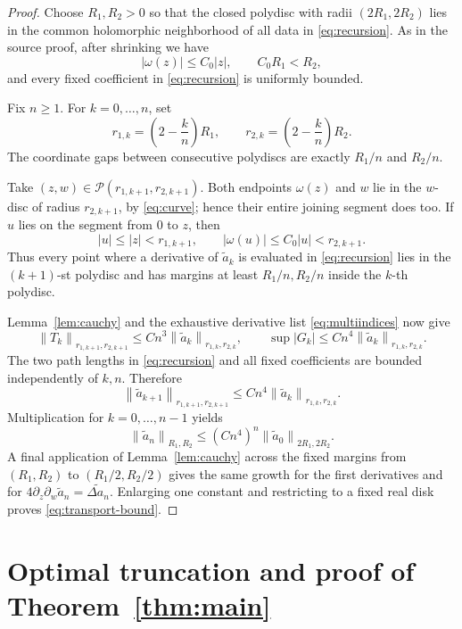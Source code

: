 \documentclass[11pt]{article}
\newcommand{\norm}[1]{\left\lVert#1\right\rVert}
\begin{document}
\begin{proof}
Choose $R_1,R_2>0$ so that the closed polydisc with radii
$(2R_1,2R_2)$ lies in the common holomorphic neighborhood of all data in
\eqref{eq:recursion}.  As in the source proof, after shrinking we have
\begin{equation}\label{eq:curve}
 |\omega(z)|\leq C_0|z|,
 \qquad C_0R_1<R_2,
\end{equation}
and every fixed coefficient in \eqref{eq:recursion} is uniformly bounded.

Fix $n\geq1$.  For $k=0,\ldots,n$, set
\[
 r_{1,k}=\left(2-\frac{k}{n}\right)R_1,
 \qquad
 r_{2,k}=\left(2-\frac{k}{n}\right)R_2.
\]
The coordinate gaps between consecutive polydiscs are exactly
$R_1/n$ and $R_2/n$.

Take $(z,w)\in\mathcal P(r_{1,k+1},r_{2,k+1})$.  Both endpoints
$\omega(z)$ and $w$ lie in the $w$-disc of radius $r_{2,k+1}$, by
\eqref{eq:curve}; hence their entire joining segment does too.  If $u$ lies
on the segment from $0$ to $z$, then
\[
 |u|\leq |z|<r_{1,k+1},
 \qquad |\omega(u)|\leq C_0|u|<r_{2,k+1}.
\]
Thus every point where a derivative of $\widetilde a_k$ is evaluated in
\eqref{eq:recursion} lies in the $(k+1)$-st polydisc and has margins at least
$R_1/n,R_2/n$ inside the $k$-th polydisc.

Lemma~\ref{lem:cauchy} and the exhaustive derivative list
\eqref{eq:multiindices} now give
\[
 \norm{T_k}_{r_{1,k+1},r_{2,k+1}}
 \leq C n^3\norm{\widetilde a_k}_{r_{1,k},r_{2,k}},
 \qquad
 \sup|G_k|\leq C n^4\norm{\widetilde a_k}_{r_{1,k},r_{2,k}}.
\]
The two path lengths in \eqref{eq:recursion} and all fixed coefficients are
bounded independently of $k,n$.  Therefore
\[
 \norm{\widetilde a_{k+1}}_{r_{1,k+1},r_{2,k+1}}
 \leq C n^4\norm{\widetilde a_k}_{r_{1,k},r_{2,k}}.
\]
Multiplication for $k=0,\ldots,n-1$ yields
\[
 \norm{\widetilde a_n}_{R_1,R_2}
 \leq (Cn^4)^n\norm{\widetilde a_0}_{2R_1,2R_2}.
\]
A final application of Lemma~\ref{lem:cauchy} across the fixed margins from
$(R_1,R_2)$ to $(R_1/2,R_2/2)$ gives the same growth for the first derivatives
and for $4\partial_z\partial_w\widetilde a_n=\widetilde{\Delta a_n}$.
Enlarging one constant and restricting to a fixed real disk proves
\eqref{eq:transport-bound}.
\end{proof}

\section{Optimal truncation and proof of Theorem~\ref{thm:main}}
\end{document}
